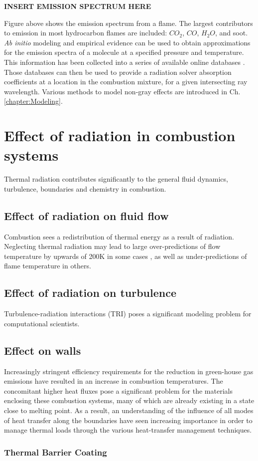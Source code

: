 \textbf{INSERT EMISSION SPECTRUM HERE}

Figure above shows the emission spectrum from a flame. The largest contributors to emission in most hydrocarbon flames are included: $CO_2$, $CO$, $H_2O$, and soot.
\textit{Ab initio} modeling and empirical evidence can be used to obtain approximations for the emission spectra of a molecule at a specified pressure and temperature. This information has been collected into a series of available online databases \cite{Rothman2010HITEMPDatabase}. Those databases can then be used to provide a radiation solver absorption coefficients at a location in the combustion mixture, for a given intersecting ray wavelength. Various methods to model non-gray effects are introduced in Ch. \ref{chapter:Modeling}.

\section{Effect of radiation in combustion systems}
Thermal radiation contributes significantly to the general fluid dynamics, turbulence, boundaries and chemistry in combustion.

\subsection{Effect of radiation on fluid flow}
Combustion sees a redistribution of thermal energy as a result of radiation. 
Neglecting thermal radiation may lead to large over-predictions of flow temperature by upwards of 200K in some cases \cite{Modest2016RadiativeSystems,Wu2021LimitationsFires,Coelho2018RadiativeSystems}, as well as under-predictions of flame temperature in others.

\subsection{Effect of radiation on turbulence}
Turbulence-radiation interactions (TRI) poses a significant modeling problem for computational scientists. 

\subsection{Effect on walls}
Increasingly stringent efficiency requirements for the reduction in green-house gas emissions have resulted in an increase in combustion temperatures. 
The concomitant higher heat fluxes pose a significant problem for the materials enclosing these combustion systems, many of which are already existing in a state close to melting point. 
As a result, an understanding of the influence of all modes of heat transfer along the boundaries have seen increasing importance in order to manage thermal loads through the various heat-transfer management techniques.

\subsubsection{Thermal Barrier Coating}
